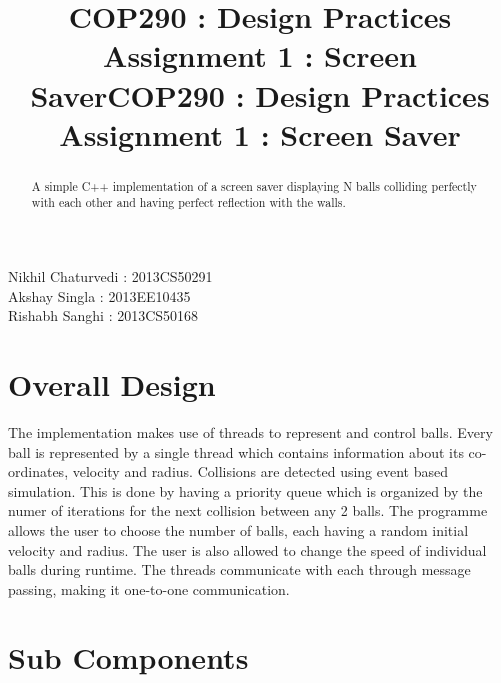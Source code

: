\documentclass[a4paper]{article}
\title{COP290 : Design Practices \\ Assignment 1 : Screen Saver}
\begin{document}
\title{COP290 : Design Practices \\ Assignment 1 : Screen Saver}
\maketitle

\begin{center}
Nikhil Chaturvedi : 2013CS50291 \\
Akshay Singla : 2013EE10435\\
Rishabh Sanghi : 2013CS50168 \\ 
\end{center}

\begin{abstract}
A simple C++ implementation of a screen saver displaying N balls colliding perfectly with each other and having perfect reflection with the walls.
\end{abstract}



\pagebreak

\section{Overall Design}
The implementation makes use of threads to represent and control balls. Every ball is represented by a single thread which contains information about its co-ordinates, velocity and radius. Collisions are detected using event based simulation. This is done by having a priority queue which is organized by the numer of iterations for the next collision between any 2 balls. The programme allows the user to choose the number of balls, each having a random initial velocity and radius. The user is also allowed to change the speed of individual balls during runtime. The threads communicate with each through message passing, making it one-to-one communication.

\section{Sub Components}
\end{document}
